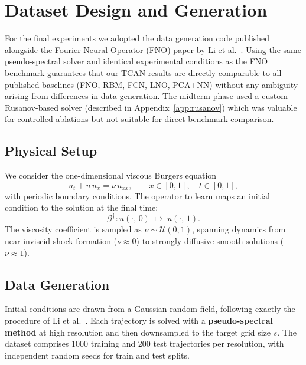 \chapter{Dataset Design and Generation}
\label{chap:dataset}

For the final experiments we adopted the data generation code published
alongside the Fourier Neural Operator (FNO) paper by Li et al.\
\cite{li2021fourier}. Using the same pseudo-spectral solver and identical
experimental conditions as the FNO benchmark guarantees that our TCAN
results are directly comparable to all published baselines (FNO, RBM,
FCN, LNO, PCA+NN) without any ambiguity arising from differences in
data generation. The midterm phase used a custom Rusanov-based solver
(described in Appendix~\ref{app:rusanov}) which was valuable for
controlled ablations but not suitable for direct benchmark comparison.

\section{Physical Setup}
\label{sec:physical-setup}

We consider the one-dimensional viscous Burgers equation
\begin{equation}
  u_t + u\,u_x = \nu\,u_{xx},
  \qquad x \in [0,1],\quad t \in [0,1],
  \label{eq:burgers}
\end{equation}
with periodic boundary conditions. The operator to learn maps an initial
condition to the solution at the final time:
\[
  \mathcal{G}^{\dagger} : u(\cdot,\,0) \;\longmapsto\; u(\cdot,\,1).
\]
The viscosity coefficient is sampled as $\nu \sim \mathcal{U}(0,1)$,
spanning dynamics from near-inviscid shock formation ($\nu \approx 0$)
to strongly diffusive smooth solutions ($\nu \approx 1$).

\section{Data Generation}
\label{sec:data-generation}

Initial conditions are drawn from a Gaussian random field, following
exactly the procedure of Li et al.\ \cite{li2021fourier}. Each trajectory is
solved with a \textbf{pseudo-spectral method} at high resolution and then
downsampled to the target grid size $s$. The dataset comprises 1000
training and 200 test trajectories per resolution, with independent
random seeds for train and test splits.

